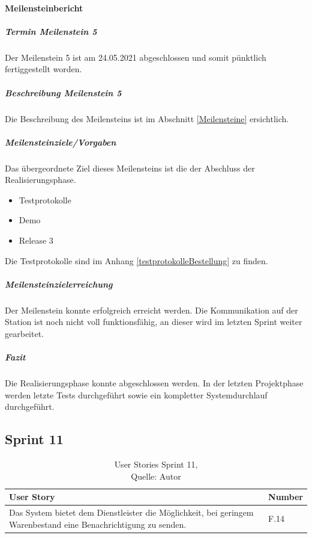 \paragraph{Meilensteinbericht}
\subparagraph{Termin Meilenstein 5}
Der Meilenstein 5 ist am 24.05.2021 abgeschlossen und somit pünktlich fertiggestellt worden. 
\subparagraph{Beschreibung Meilenstein 5}
Die Beschreibung des Meilensteins ist im Abschnitt \ref{Meilensteine} ersichtlich. 
\subparagraph{Meilensteinziele/Vorgaben}
Das übergeordnete Ziel dieses Meilensteins ist die der Abschluss der Realisierungsphase. 
\begin{itemize}
	\item Testprotokolle
	\item Demo
	\item Release 3
\end{itemize}
Die Testprotokolle sind im Anhang \ref{testprotokolleBestellung} zu finden. 
\subparagraph{Meilensteinzielerreichung}
Der Meilenstein konnte erfolgreich erreicht werden. Die Kommunikation auf der Station ist noch nicht voll funktionsfähig, an dieser wird im letzten Sprint weiter gearbeitet. 
\subparagraph{Fazit}
Die Realisierungsphase konnte abgeschlossen werden. In der letzten Projektphase werden letzte Tests durchgeführt sowie ein kompletter Systemdurchlauf durchgeführt. 

\subsection{Sprint 11}
\begin{table}[H]
	\setlength\extrarowheight{2pt} %
	\begin{tabularx}{\textwidth}{|X|l|}
		\hline
		\textbf{User Story} & \textbf{Number} \\
		\hline
		Das System bietet dem Dienstleister die Möglichkeit, bei geringem Warenbestand eine Benachrichtigung zu senden. & F.14\\
		\hline
	\end{tabularx} 
	\caption[User Stories Sprint 11]{User Stories Sprint 11,\\ Quelle: Autor}
\end{table}\label{userStoriesSprint11}

